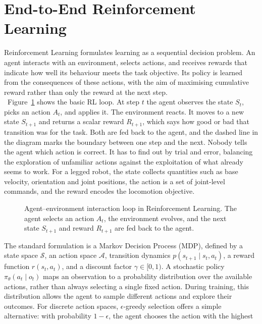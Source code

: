 \section{End-to-End Reinforcement Learning}

Reinforcement Learning formulates learning as a sequential decision problem.
An agent interacts with an environment, selects actions, and receives rewards
that indicate how well its behaviour meets the task objective. Its policy is
learned from the consequences of these actions, with the aim of maximising
cumulative reward rather than only the reward at the next step.\\
\
Figure~\ref{fig:rl_loop} shows the basic RL loop. At step \(t\) the agent
observes the state \(S_t\), picks an action \(A_t\), and applies it. The
environment reacts. It moves to a new state \(S_{t+1}\) and returns a scalar
reward \(R_{t+1}\), which says how good or bad that transition was for the
task. Both are fed back to the agent, and the dashed line in the diagram marks
the boundary between one step and the next. Nobody tells the agent which action is correct. It has to find out by
trial and error, balancing the exploration of unfamiliar actions against the
exploitation of what already seems to work. For a legged robot, the state collects quantities such as
base velocity, orientation and joint positions, the action is a set of
joint-level commands, and the reward encodes the locomotion objective.
%
\begin{figure}[H]
    \centering
    
    \caption{Agent--environment interaction loop in Reinforcement Learning.
    The agent selects an action \(A_t\), the environment evolves, and the
    next state \(S_{t+1}\) and reward \(R_{t+1}\) are fed back to the agent.}
    \label{fig:rl_loop}
\end{figure}
%
\noindent The standard formulation is a Markov Decision Process (MDP), defined by a state
space \(\mathcal{S}\), an action space \(\mathcal{A}\), transition dynamics
\(p(s_{t+1} \mid s_t, a_t)\), a reward function \(r(s_t,a_t)\), and a
discount factor \(\gamma \in [0,1)\). A stochastic policy
\(\pi_\theta(a_t \mid o_t)\) maps an observation to a probability
distribution over the available actions, rather than always selecting a
single fixed action. During training, this distribution allows the agent to
sample different actions and explore their outcomes. For discrete action
spaces, \(\epsilon\)-greedy selection offers a simple alternative: with
probability \(1-\epsilon\), the agent chooses the action with the highest
